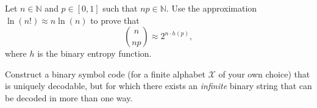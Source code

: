\documentclass[a4paper,10pt,landscape,twocolumn]{scrartcl}
\begin{document}
\begin{exercise}
Let $n \in \mathbb{N}$ and $p \in [0,1]$ such that $np \in \mathbb{N}$. Use the approximation $\ln(n!) \approx n \ln(n)$ to prove that
\[
{n \choose np} \approx 2^{n \cdot h(p)},
\]
where $h$ is the binary entropy function.
\end{exercise}

\begin{bonusexercise}
Construct a binary symbol code (for a finite alphabet $\mathcal{X}$ of your own choice) that is uniquely decodable, but for which there exists an \emph{infinite} binary string that can be decoded in more than one way.
\end{bonusexercise}
\end{document}
